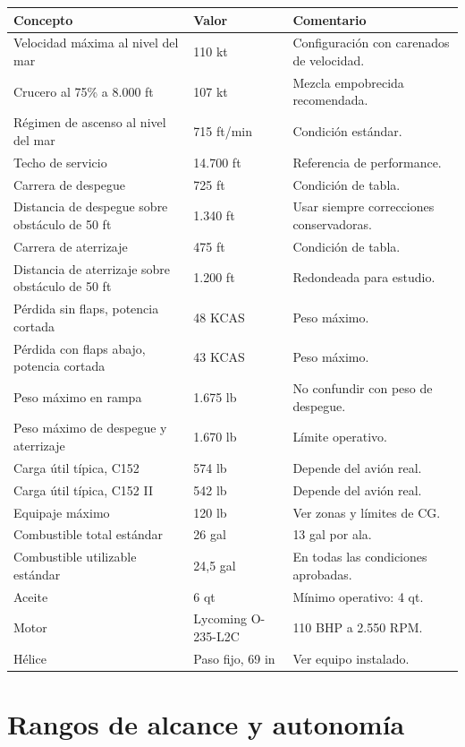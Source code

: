 \documentclass[11pt,oneside]{book}
\begin{document}
\begin{longtable}{@{}p{}p{}p{}@{}}
\toprule
\textbf{Concepto} & \textbf{Valor} & \textbf{Comentario} \\
\midrule
Velocidad máxima al nivel del mar & 110 kt & Configuración con carenados de velocidad. \\
Crucero al 75\% a 8.000 ft & 107 kt & Mezcla empobrecida recomendada. \\
Régimen de ascenso al nivel del mar & 715 ft/min & Condición estándar. \\
Techo de servicio & 14.700 ft & Referencia de performance. \\
Carrera de despegue & 725 ft & Condición de tabla. \\
Distancia de despegue sobre obstáculo de 50 ft & 1.340 ft & Usar siempre correcciones conservadoras. \\
Carrera de aterrizaje & 475 ft & Condición de tabla. \\
Distancia de aterrizaje sobre obstáculo de 50 ft & 1.200 ft & Redondeada para estudio. \\
Pérdida sin flaps, potencia cortada & 48 KCAS & Peso máximo. \\
Pérdida con flaps abajo, potencia cortada & 43 KCAS & Peso máximo. \\
Peso máximo en rampa & 1.675 lb & No confundir con peso de despegue. \\
Peso máximo de despegue y aterrizaje & 1.670 lb & Límite operativo. \\
Carga útil típica, C152 & 574 lb & Depende del avión real. \\
Carga útil típica, C152 II & 542 lb & Depende del avión real. \\
Equipaje máximo & 120 lb & Ver zonas y límites de CG. \\
Combustible total estándar & 26 gal & 13 gal por ala. \\
Combustible utilizable estándar & 24,5 gal & En todas las condiciones aprobadas. \\
Aceite & 6 qt & Mínimo operativo: 4 qt. \\
Motor & Lycoming O-235-L2C & 110 BHP a 2.550 RPM. \\
Hélice & Paso fijo, 69 in & Ver equipo instalado. \\
\bottomrule
\end{longtable}

\section{Rangos de alcance y autonomía}
\end{document}
